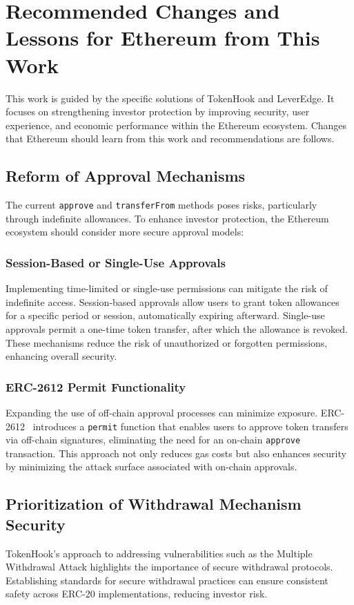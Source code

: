 \section{Recommended Changes and Lessons for Ethereum from This Work}
This work is guided by the specific solutions of TokenHook and LeverEdge. It focuses on strengthening investor protection by improving security, user experience, and economic performance within the Ethereum ecosystem. Changes that Ethereum should learn from this work and recommendations are follows.

\subsection{Reform of Approval Mechanisms}
The current \texttt{approve} and \texttt{transferFrom} methods poses risks, particularly through indefinite allowances. To enhance investor protection, the Ethereum ecosystem should consider more secure approval models:

\subsubsection{Session-Based or Single-Use Approvals}
Implementing time-limited or single-use permissions can mitigate the risk of indefinite access. Session-based approvals allow users to grant token allowances for a specific period or session, automatically expiring afterward. Single-use approvals permit a one-time token transfer, after which the allowance is revoked. These mechanisms reduce the risk of unauthorized or forgotten permissions, enhancing overall security.

\subsubsection{ERC-2612 Permit Functionality}
Expanding the use of off-chain approval processes can minimize exposure. ERC-2612~\cite{eip2612} introduces a \texttt{permit} function that enables users to approve token transfers via off-chain signatures, eliminating the need for an on-chain \texttt{approve} transaction. This approach not only reduces gas costs but also enhances security by minimizing the attack surface associated with on-chain approvals.

\subsection{Prioritization of Withdrawal Mechanism Security}
TokenHook's approach to addressing vulnerabilities such as the Multiple Withdrawal Attack highlights the importance of secure withdrawal protocols. Establishing standards for secure withdrawal practices can ensure consistent safety across ERC-20 implementations, reducing investor risk.

